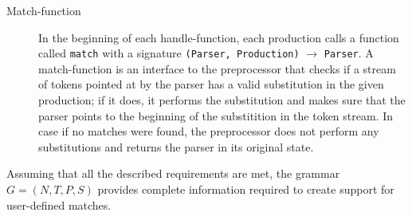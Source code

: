 \begin{description}
    \item[Match-function] In the beginning of each handle-function, each
    production calls a function called \verb|match| with a signature
    \verb/(Parser, Production)/ $\to$ \verb/Parser/.  A match-function 
    is an interface to the preprocessor that checks if a stream of tokens
    pointed at by the parser has a valid substitution in the given
    production; if it does, it performs the substitution and makes sure
    that the parser points to the beginning of the substitition in the
    token stream.  In case if no matches were found, the preprocessor
    does not perform any substitutions and returns the parser in its
    original state.
\end{description}

Assuming that all the described requirements are met, the grammar 
$G = (N, T, P, S)$ provides complete information required to create 
support for user-defined matches.

